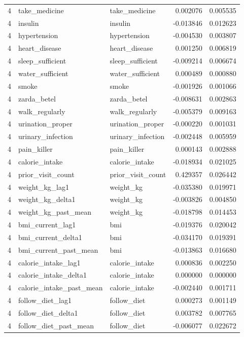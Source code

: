 \begin{longtable}{rllrr}
4 & take\_medicine & take\_medicine & 0.002076 & 0.005535 \\
4 & insulin & insulin & -0.013846 & 0.012623 \\
4 & hypertension & hypertension & -0.004530 & 0.003807 \\
4 & heart\_disease & heart\_disease & 0.001250 & 0.006819 \\
4 & sleep\_sufficient & sleep\_sufficient & -0.009214 & 0.006674 \\
4 & water\_sufficient & water\_sufficient & 0.000489 & 0.000880 \\
4 & smoke & smoke & -0.001926 & 0.001066 \\
4 & zarda\_betel & zarda\_betel & -0.008631 & 0.002863 \\
4 & walk\_regularly & walk\_regularly & -0.005379 & 0.009163 \\
4 & urination\_proper & urination\_proper & -0.000220 & 0.001031 \\
4 & urinary\_infection & urinary\_infection & -0.002448 & 0.005959 \\
4 & pain\_killer & pain\_killer & 0.000143 & 0.002888 \\
4 & calorie\_intake & calorie\_intake & -0.018934 & 0.021025 \\
4 & prior\_visit\_count & prior\_visit\_count & 0.429357 & 0.026442 \\
4 & weight\_kg\_lag1 & weight\_kg & -0.035380 & 0.019971 \\
4 & weight\_kg\_delta1 & weight\_kg & -0.003826 & 0.004850 \\
4 & weight\_kg\_past\_mean & weight\_kg & -0.018798 & 0.014453 \\
4 & bmi\_current\_lag1 & bmi & -0.019376 & 0.020042 \\
4 & bmi\_current\_delta1 & bmi & -0.034170 & 0.019391 \\
4 & bmi\_current\_past\_mean & bmi & -0.013863 & 0.016680 \\
4 & calorie\_intake\_lag1 & calorie\_intake & 0.000836 & 0.002250 \\
4 & calorie\_intake\_delta1 & calorie\_intake & 0.000000 & 0.000000 \\
4 & calorie\_intake\_past\_mean & calorie\_intake & -0.002440 & 0.001711 \\
4 & follow\_diet\_lag1 & follow\_diet & 0.000273 & 0.001149 \\
4 & follow\_diet\_delta1 & follow\_diet & 0.003782 & 0.007765 \\
4 & follow\_diet\_past\_mean & follow\_diet & -0.006077 & 0.022672 \\

\end{longtable}
